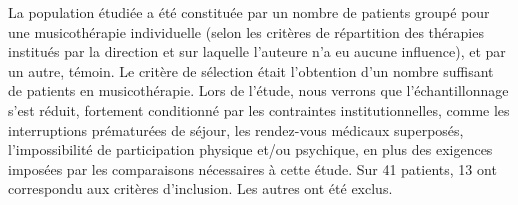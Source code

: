  La population étudiée a été constituée par un nombre de patients groupé pour une musicothérapie 
 individuelle (selon les critères de 
 répartition des thérapies institués par 
 la direction et 
 sur laquelle l'auteure n'a eu aucune influence),  et par un autre, témoin.
  Le critère de sélection était l'obtention
 d'un nombre suffisant de 
 patients en musicothérapie.
  Lors de l'étude, nous verrons que l'échantillonnage s'est réduit, fortement conditionné par les 
  contraintes
  institutionnelles, comme les interruptions prématurées de séjour, les rendez-vous
  médicaux superposés, l'impossibilité de participation physique et/ou
  psychique, 
   en plus des exigences imposées par les comparaisons nécessaires à cette étude. Sur 41 patients, 13 
   ont correspondu aux critères d'inclusion. Les autres ont été exclus.
